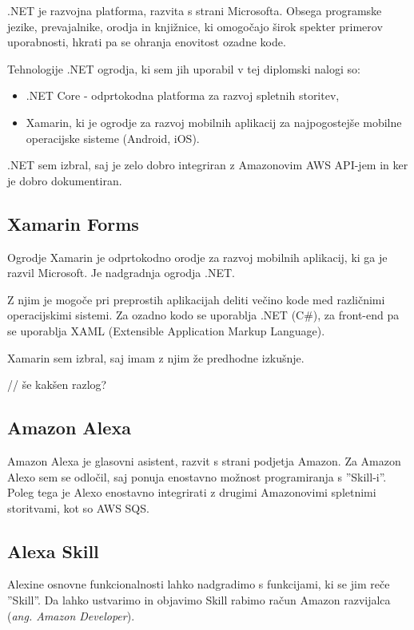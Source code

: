 \documentclass[a4paper, 12pt]{book}
\begin{document}
.NET je razvojna platforma, razvita s strani Microsofta.
Obsega programske jezike, prevajalnike, orodja in knjižnice, ki omogočajo širok spekter primerov uporabnosti, hkrati pa se ohranja enovitost ozadne kode.

Tehnologije .NET ogrodja, ki sem jih uporabil v tej diplomski nalogi so:
\begin{itemize}
	\item .NET Core - odprtokodna platforma za razvoj spletnih storitev,
	\item Xamarin, ki je ogrodje za razvoj mobilnih aplikacij za najpogostejše mobilne operacijske sisteme (Android, iOS).
\end{itemize}

.NET sem izbral, saj je zelo dobro integriran z Amazonovim AWS API-jem in ker je dobro dokumentiran.

\subsection{Xamarin Forms}

Ogrodje Xamarin je odprtokodno orodje za razvoj mobilnih aplikacij, ki ga je razvil Microsoft. 
Je nadgradnja ogrodja .NET.

Z njim je mogoče pri preprostih aplikacijah deliti večino kode med različnimi operacijskimi sistemi. 
Za ozadno kodo se uporablja .NET (C\#), za front-end pa se uporablja XAML (Extensible Application Markup Language).

Xamarin sem izbral, saj imam z njim že predhodne izkušnje.

// še kakšen razlog?

\subsection{Amazon Alexa}

Amazon Alexa je glasovni asistent, razvit s strani podjetja Amazon.
Za Amazon Alexo sem se odločil, saj ponuja enostavno možnost programiranja s ''Skill-i''.
Poleg tega je Alexo enostavno integrirati z drugimi Amazonovimi spletnimi storitvami, kot so AWS SQS.

\subsection{Alexa Skill}

Alexine osnovne funkcionalnosti lahko nadgradimo s funkcijami, ki se jim reče ''Skill''.
Da lahko ustvarimo in objavimo Skill rabimo račun Amazon razvijalca (\textit{ang. Amazon Developer}).
\end{document}
